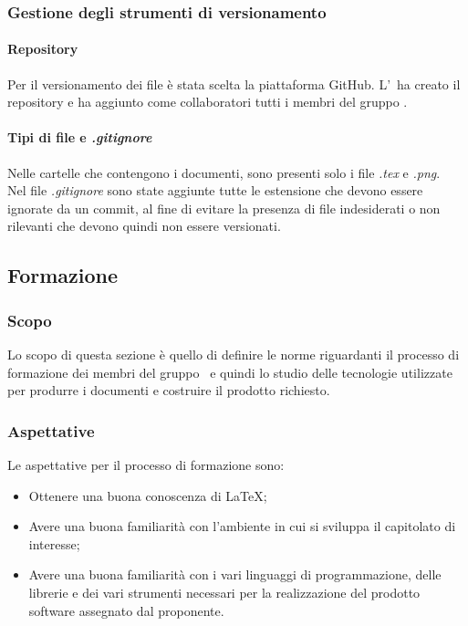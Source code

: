     \subsubsection{Gestione degli strumenti di versionamento}
      \paragraph{Repository}
        Per il versionamento dei file è stata scelta la piattaforma GitHub\glo. L'\roleAdministrator\ ha creato il repository e ha aggiunto 
        come collaboratori tutti i membri del gruppo \groupName.

      \paragraph{Tipi di file e \textit{.gitignore}}
        Nelle cartelle che contengono i documenti, sono presenti solo i file \textit{.tex} e \textit{.png}.\\
        Nel file \textit{.gitignore} sono state aggiunte tutte le estensione che devono essere ignorate da un commit, al fine di evitare la presenza di file indesiderati 
        o non rilevanti che devono quindi non essere versionati.

 



        \subsection{Formazione} \label{subsection: formazione}
        \subsubsection {Scopo}
        Lo scopo di questa sezione è quello di definire le norme riguardanti il processo di formazione dei membri del gruppo \groupName\ e quindi lo studio delle tecnologie utilizzate per produrre i documenti e costruire il prodotto richiesto.
        \subsubsection {Aspettative}
        Le aspettative per il processo di formazione sono:
        \begin {itemize}
          \item Ottenere una buona conoscenza di \LaTeX;
          \item Avere una buona familiarità con l'ambiente in cui si sviluppa il capitolato di interesse;
          \item Avere una buona familiarità con i vari linguaggi di programmazione, delle librerie e dei vari strumenti necessari per la realizzazione del prodotto software assegnato dal proponente.
        \end {itemize}
